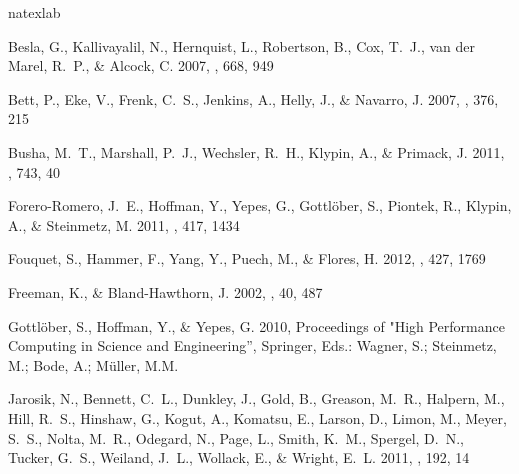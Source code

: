 \documentclass{emulateapj}
\begin{document}

% 
\begin{thebibliography}{28}
\expandafter\ifx\csname natexlab\endcsname\relax\def\natexlab#1{#1}\fi

{Besla}, G., {Kallivayalil}, N., {Hernquist}, L., {Robertson}, B., {Cox},
  T.~J., {van der Marel}, R.~P., \& {Alcock}, C. 2007, \apj, 668, 949

{Bett}, P., {Eke}, V., {Frenk}, C.~S., {Jenkins}, A., {Helly}, J., \&
  {Navarro}, J. 2007, \mnras, 376, 215

{Busha}, M.~T., {Marshall}, P.~J., {Wechsler}, R.~H., {Klypin}, A., \&
  {Primack}, J. 2011, \apj, 743, 40

{Forero-Romero}, J.~E., {Hoffman}, Y., {Yepes}, G., {Gottl{\"o}ber}, S.,
  {Piontek}, R., {Klypin}, A., \& {Steinmetz}, M. 2011, \mnras, 417, 1434

{Fouquet}, S., {Hammer}, F., {Yang}, Y., {Puech}, M., \& {Flores}, H. 2012,
  \mnras, 427, 1769

{Freeman}, K., \& {Bland-Hawthorn}, J. 2002, \araa, 40, 487

{Gottl{\"o}ber}, S., {Hoffman}, Y., \& {Yepes}, G. 2010, 
Proceedings of "High Performance Computing in Science and Engineering'',  
Springer, Eds.: Wagner, S.; Steinmetz, M.; Bode, A.; M\"uller, M.M. 


{Jarosik}, N., {Bennett}, C.~L., {Dunkley}, J., {Gold}, B., {Greason}, M.~R.,
  {Halpern}, M., {Hill}, R.~S., {Hinshaw}, G., {Kogut}, A., {Komatsu}, E.,
  {Larson}, D., {Limon}, M., {Meyer}, S.~S., {Nolta}, M.~R., {Odegard}, N.,
  {Page}, L., {Smith}, K.~M., {Spergel}, D.~N., {Tucker}, G.~S., {Weiland},
  J.~L., {Wollack}, E., \& {Wright}, E.~L. 2011, \apjs, 192, 14


\end{thebibliography}
\end{document}
